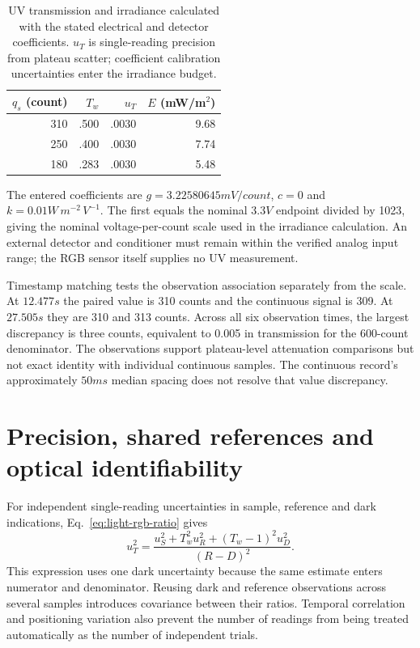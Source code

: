 \begin{table}[!htbp]
\caption{UV transmission and irradiance calculated with the stated electrical and detector coefficients. $u_T$ is single-reading precision from plateau scatter; coefficient calibration uncertainties enter the irradiance budget.}
\label{tab:light-rgb-uv}
\centering\footnotesize
\begin{tabular}{@{}rrrr@{}}\toprule
$q_s$ (count) & $T_w$ & $u_T$ & $E$ (mW/m$^2$)\\\midrule
310 & .500 & .0030 & 9.68\\
250 & .400 & .0030 & 7.74\\
180 & .283 & .0030 & 5.48\\\bottomrule
\end{tabular}
\end{table}

The entered coefficients are $g=3.22580645\unit{mV/count}$, $c=0$ and $k=0.01\unit{W\,m^{-2}\,V^{-1}}$. The first equals the nominal $3.3\unit{V}$ endpoint divided by 1023, giving the nominal voltage-per-count scale used in the irradiance calculation. An external detector and conditioner must remain within the verified analog input range; the RGB sensor itself supplies no UV measurement.

Timestamp matching tests the observation association separately from the scale. At $12.477\unit{s}$ the paired value is 310 counts and the continuous signal is 309. At $27.505\unit{s}$ they are 310 and 313 counts. Across all six observation times, the largest discrepancy is three counts, equivalent to 0.005 in transmission for the 600-count denominator. The observations support plateau-level attenuation comparisons but not exact identity with individual continuous samples. The continuous record's approximately $50\unit{ms}$ median spacing does not resolve that value discrepancy.

\section{Precision, shared references and optical identifiability}
For independent single-reading uncertainties in sample, reference and dark indications, Eq.~\eqref{eq:light-rgb-ratio} gives
\begin{equation}
 u_T^2=\frac{u_S^2+T_w^2u_R^2+(T_w-1)^2u_D^2}{(R-D)^2}.
 \label{eq:light-rgb-uncertainty}
\end{equation}
This expression uses one dark uncertainty because the same estimate enters numerator and denominator. Reusing dark and reference observations across several samples introduces covariance between their ratios. Temporal correlation and positioning variation also prevent the number of readings from being treated automatically as the number of independent trials.

